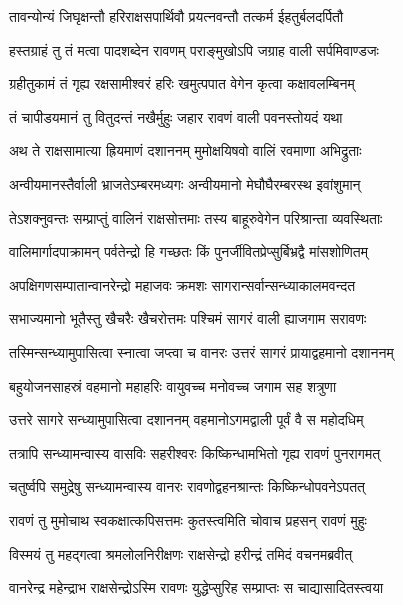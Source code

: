\twolineshloka
{तावन्योन्यं जिघृक्षन्तौ हरिराक्षसपार्थिवौ}
{प्रयत्नवन्तौ तत्कर्म ईहतुर्बलदर्पितौ} %

\twolineshloka
{हस्तग्राहं तु तं मत्वा पादशब्देन रावणम्}
{पराङ्मुखोऽपि जग्राह वाली सर्पमिवाण्डजः} %

\twolineshloka
{ग्रहीतुकामं तं गृह्य रक्षसामीश्वरं हरिः}
{खमुत्पपात वेगेन कृत्वा कक्षावलम्बिनम्} %

\twolineshloka
{तं चापीडयमानं तु वितुदन्तं नखैर्मुहुः}
{जहार रावणं वाली पवनस्तोयदं यथा} %

\twolineshloka
{अथ ते राक्षसामात्या ह्रियमाणं दशाननम्}
{मुमोक्षयिषवो वालिं रवमाणा अभिद्रुताः} %

\twolineshloka
{अन्वीयमानस्तैर्वाली भ्राजतेऽम्बरमध्यगः}
{अन्वीयमानो मेघौघैरम्बरस्थ इवांशुमान्} %

\twolineshloka
{तेऽशक्नुवन्तः सम्प्राप्तुं वालिनं राक्षसोत्तमाः}
{तस्य बाहूरुवेगेन परिश्रान्ता व्यवस्थिताः} %

\twolineshloka
{वालिमार्गादपाक्रामन् पर्वतेन्द्रो हि गच्छतः}
{किं पुनर्जीवितप्रेप्सुर्बिभ्रद्वै मांसशोणितम्} %

\twolineshloka
{अपक्षिगणसम्पातान्वानरेन्द्रो महाजवः}
{क्रमशः सागरान्सर्वान्सन्ध्याकालमवन्दत} %

\twolineshloka
{सभाज्यमानो भूतैस्तु खैचरैः खैचरोत्तमः}
{पश्चिमं सागरं वाली ह्याजगाम सरावणः} %

\twolineshloka
{तस्मिन्सन्ध्यामुपासित्वा स्नात्वा जप्त्वा च वानरः}
{उत्तरं सागरं प्रायाद्वहमानो दशाननम्} %

\twolineshloka
{बहुयोजनसाहस्रं वहमानो महाहरिः}
{वायुवच्च मनोवच्च जगाम सह शत्रुणा} %

\twolineshloka
{उत्तरे सागरे सन्ध्यामुपासित्वा दशाननम्}
{वहमानोऽगमद्वाली पूर्वं वै स महोदधिम्} %

\twolineshloka
{तत्रापि सन्ध्यामन्वास्य वासविः सहरीश्वरः}
{किष्किन्धामभितो गृह्य रावणं पुनरागमत्} %

\twolineshloka
{चतुर्ष्वपि समुद्रेषु सन्ध्यामन्वास्य वानरः}
{रावणोद्वहनश्रान्तः किष्किन्धोपवनेऽपतत्} %

\twolineshloka
{रावणं तु मुमोचाथ स्वकक्षात्कपिसत्तमः}
{कुतस्त्वमिति चोवाच प्रहसन् रावणं मुहुः} %

\twolineshloka
{विस्मयं तु महद्गत्वा श्रमलोलनिरीक्षणः}
{राक्षसेन्द्रो हरीन्द्रं तमिदं वचनमब्रवीत्} %

\twolineshloka
{वानरेन्द्र महेन्द्राभ राक्षसेन्द्रोऽस्मि रावणः}
{युद्धेप्सुरिह सम्प्राप्तः स चाद्यासादितस्त्वया} %

